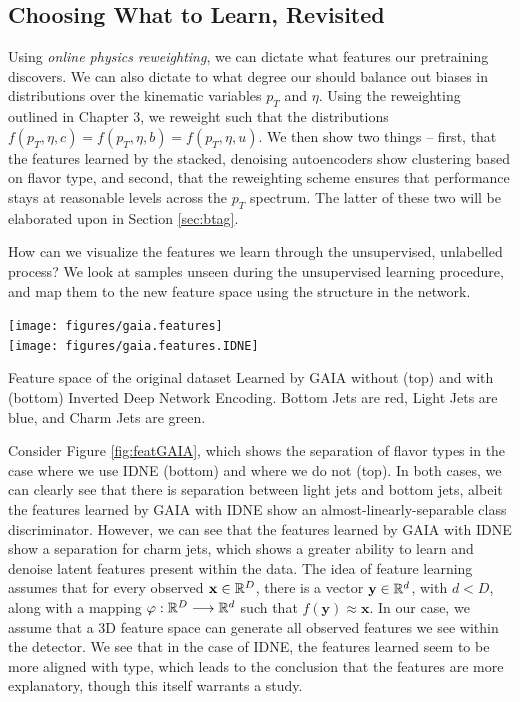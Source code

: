 \subsection{Choosing What to Learn, Revisited}

Using \emph{online physics reweighting}, we can dictate what features our pretraining discovers. We can also dictate to what degree our \nn{} should balance out biases in distributions over the kinematic variables $p_T$ and $\eta$. Using the reweighting outlined in Chapter 3, we reweight such that the distributions $f(p_T, \eta, c)=f(p_T, \eta, b)=f(p_T, \eta, u)$. We then show two things -- first, that the features learned by the stacked, denoising autoencoders show clustering based on flavor type, and second, that the reweighting scheme ensures that performance stays at reasonable levels across the $p_T$ spectrum. The latter of these two will be elaborated upon in Section \ref{sec:btag}.

How can we visualize the features we learn through the unsupervised, unlabelled process? We look at samples unseen during the unsupervised learning procedure, and map them to the new feature space using the structure in the network. 

\begin{FPfigure}
\texttt{[image: figures/gaia.features]}\\
\texttt{[image: figures/gaia.features.IDNE]}
\caption[The ATLAS detector]{Feature space of the original dataset Learned by GAIA without (top) and with (bottom) Inverted Deep Network Encoding. Bottom Jets are red, Light Jets are blue, and Charm Jets are green.
\label{fig:featGAIA}}
\end{FPfigure}


Consider Figure \ref{fig:featGAIA}, which shows the separation of flavor types in the case where we use IDNE (bottom) and where we do not (top). In both cases, we can clearly see that there is separation between light jets and bottom jets, albeit the features learned by GAIA with IDNE show an almost-linearly-separable class discriminator. However, we can see that the features learned by GAIA with IDNE show a separation for charm jets, which shows a greater ability to learn and denoise latent features present within the data. The idea of feature learning assumes that for every observed  $\mathbf{x}\in\mathbb{R}^D$, there is a vector $\mathbf{y}\in\mathbb{R}^d$, with $d<D$, along with a mapping $\varphi:\mathbb{R}^D\longrightarrow\mathbb{R}^d$ such that $f(\mathbf{y}) \approx \mathbf{x}$. In our case, we assume that a 3D feature space can generate all observed features we see within the detector. We see that in the case of IDNE, the features learned seem to be more aligned with type, which leads to the conclusion that the features are more explanatory, though this itself warrants a study.

